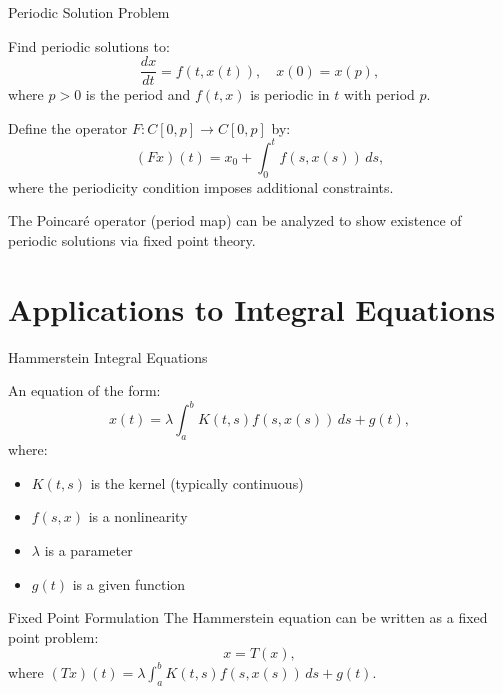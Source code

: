 \documentclass[aspectratio=169,10pt]{beamer}
\begin{document}
\begin{frame}{Periodic Solution Problem}
  \begin{problem}
    Find periodic solutions to:
    \begin{equation}
      \frac{dx}{dt} = f(t, x(t)), \quad x(0) = x(p),
    \end{equation}
    where $p > 0$ is the period and $f(t, x)$ is periodic in $t$ with period $p$.
  \end{problem}

  \vspace{0.4cm}

  \begin{solution}
    Define the operator $F: C[0,p] \to C[0,p]$ by:
    \[
      (Fx)(t) = x_0 + \int_0^t f(s, x(s)) \, ds,
    \]
    where the periodicity condition imposes additional constraints.

    The Poincaré operator (period map) can be analyzed to show existence
    of periodic solutions via fixed point theory.
  \end{solution}
\end{frame}

\section{Applications to Integral Equations}

\begin{frame}{Hammerstein Integral Equations}
  \begin{definition}
    An equation of the form:
    \[
      x(t) = \lambda \int_a^b K(t,s) f(s, x(s)) \, ds + g(t),
    \]
    where:
    \begin{itemize}
      \item $K(t,s)$ is the kernel (typically continuous)
      \item $f(s, x)$ is a nonlinearity
      \item $\lambda$ is a parameter
      \item $g(t)$ is a given function
    \end{itemize}
  \end{definition}

  \vspace{0.4cm}

  \begin{block}{Fixed Point Formulation}
    The Hammerstein equation can be written as a fixed point problem:
    \[
      x = T(x),
    \]
    where $(T x)(t) = \lambda \int_a^b K(t,s) f(s, x(s)) \, ds + g(t)$.
  \end{block}
\end{frame}
\end{document}
